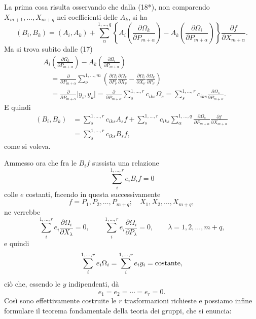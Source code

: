 \documentclass[11pt]{book}
\begin{document}
La prima cosa risulta osservando che dalla (18*), non comparendo $X_{m+1},\ldots,X_{m+q}$ nei coefficienti delle $A_k$, si ha
\[
 (B_i,B_k)=(A_i,A_k)+\sum\limits_{\alpha}^{1,\ldots,q}
 \left\{A_i\left(\frac{\partial\Omega_k}{\partial P_{m+\alpha}}\right)
       -A_k\left(\frac{\partial\Omega_i}{\partial P_{m+\alpha}}\right)
 \right\}
 \frac{\partial f}{\partial X_{m+\alpha}}.
\]
Ma si trova subito dalle (17)
\[
\begin{split}
&A_i\left(\frac{\partial\Omega_k}{\partial P_{m+\alpha}}\right)
 -A_k\left(\frac{\partial\Omega_i}{\partial P_{m+\alpha}}\right)       \\
&\quad=\frac{\partial}{\partial P_{m+\alpha}}
 \sum\limits_{\nu}^{1,\ldots,m}
 \left(
  \frac{\partial\Omega_i}{\partial P_\nu}
  \frac{\partial\Omega_k}{\partial X_\nu}
 -\frac{\partial\Omega_i}{\partial X_\nu}
  \frac{\partial\Omega_k}{\partial P_\nu}
 \right)                                                   \\
&\quad=\frac{\partial}{\partial P_{m+\alpha}}\lvert y_i,y_k\rvert
 =\frac{\partial}{\partial P_{m+\alpha}}\sum\limits_s^{1,\ldots,r}c_{iks}\Omega_s
 =\sum\limits_s^{1,\ldots,r} c_{iks}\frac{\partial\Omega_s}{\partial P_{m+\alpha}}.
\end{split}
\]
E quindi
\[
\begin{split}
 (B_i,B_k)&=\sum\limits_s^{1,\ldots,r}c_{iks}A_s f
 +\sum\limits_s^{1,\ldots,r}c_{iks}\sum\limits_{\alpha}^{1,\ldots,q}
 \frac{\partial\Omega_s}{\partial P_{m+\alpha}}
 \frac{\partial f}{\partial X_{m+\alpha}}                 \\
 &=\sum\limits_s^{1,\ldots,r}c_{iks}B_s f,
\end{split}
\]
come si voleva.

Ammesso ora che fra le $B_if$ sussista una relazione
\[
 \sum\limits_i^{1,\ldots,r} e_iB_i f=0
\]
colle $e$ costanti, facendo in questa successivamente
\[
 f=P_1,P_2,\ldots,P_{m+q};\quad X_1,X_2,\ldots,X_{m+q},
\]
ne verrebbe
\[
 \sum\limits_i^{1,\ldots,r} e_i\frac{\partial\Omega_i}{\partial X_\lambda}=0,
 \qquad
 \sum\limits_i^{1,\ldots,r} e_i\frac{\partial\Omega_i}{\partial P_\lambda}=0,
 \qquad \lambda=1,2,\ldots,m+q,
\]
e quindi
\[
 \sum\limits_i^{1,\ldots,r} e_i\Omega_i=\sum\limits_i^{1,\ldots,r} e_iy_i=\hbox{costante},
\]
ciò che, essendo le $y$ indipendenti, dà
\[
 e_1=e_2=\cdots=e_r=0.
\]
Così sono effettivamente costruite le $r$ trasformazioni richieste e possiamo infine formulare il teorema fondamentale della teoria dei gruppi, che si enuncia:
\end{document}
